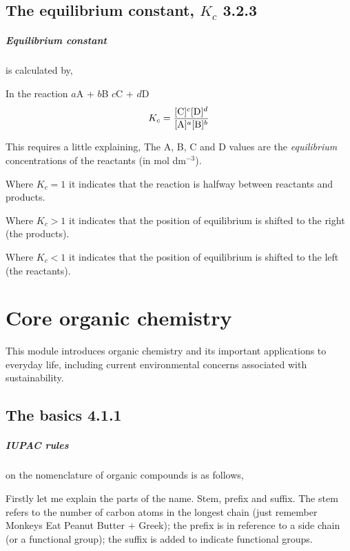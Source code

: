 \documentclass[11pt,a4paper]{memoir}
\begin{document}
\section{The equilibrium constant, $K_c$ 3.2.3}

	\paragraph{Equilibrium constant} is calculated by,
	\begin{center}
		In the reaction $a$A + $b$B \ch{<=>} $c$C + $d$D
		\begin{equation}
			K_c = \frac{[\textnormal{C}]^c[\textnormal{D}]^d}{[\textnormal{A}]^a[\textnormal{B}]^b}
		\end{equation}
	\end{center}
	This requires a little explaining, The A, B, C and D values are the \textit{equilibrium} concentrations of the reactants (in mol dm$^{-3}$).
	
	Where $K_c = 1$ it indicates that the reaction is halfway between reactants and products.
	
	Where $K_c > 1$ it indicates that the position of equilibrium is shifted to the right (the products).
	
	Where $K_c < 1$ it indicates that the position of equilibrium is shifted to the left (the reactants).
	
\chapter{Core organic chemistry}
This module introduces organic chemistry and its important applications to everyday life, including current environmental concerns associated with sustainability.

\section{The basics 4.1.1}

	\paragraph{IUPAC rules} on the nomenclature of organic compounds is as follows,
		
	Firstly let me explain the parts of the name. Stem, prefix and suffix. The stem refers to the number of carbon atoms in the longest chain (just remember Monkeys Eat Peanut Butter + Greek); the prefix is in reference to a side chain (or a functional group); the suffix is added to indicate functional groups.
	
\end{document}
